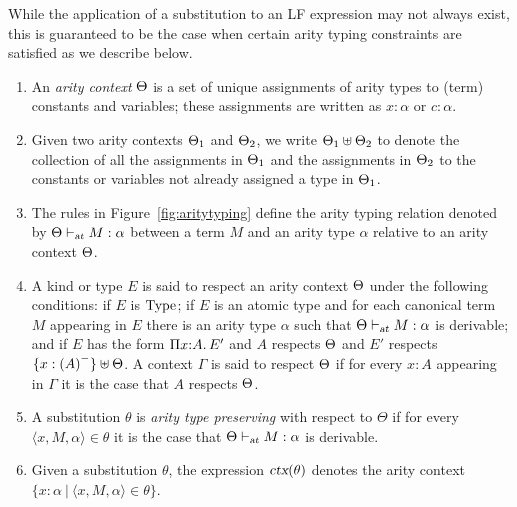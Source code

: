 While the application of a substitution to an LF expression may not
always exist, this is guaranteed to be the case when certain arity
typing constraints are satisfied as we describe below.

\begin{definition}\label{def:aritytyping}
\begin{enumerate}
\item An \emph{arity context} $\Theta$ is a set of unique
  assignments of arity types to (term) constants and variables; these
  assignments are written as $x:\alpha$ or $c:\alpha$.
%
\item Given two arity contexts $\Theta_1$ and $\Theta_2$, we write
$\Theta_1 \uplus \Theta_2$ to denote the collection of all the 
assignments in $\Theta_1$ and the assignments in $\Theta_2$ to
the constants or variables not already assigned a type in $\Theta_1$. 
%
\item
The rules in Figure~\ref{fig:aritytyping} define the arity typing
relation denoted by $\Theta \vdash_{\mbox{\sl \scriptsize at}} M : \alpha$ between
a term $M$ and an arity type $\alpha$ relative to an arity context
$\Theta$. 
%
\item 
A kind or type $E$ is said to respect an arity context $\Theta$
under the following conditions: if $E$ is $\mbox{Type}$; if $E$ is an atomic
type and for each canonical term $M$ appearing in $E$ there is an
arity type $\alpha$ such that $\Theta \vdash_{\mbox{\sl \scriptsize at}} M : \alpha$ is 
derivable; and if $E$ has the form $\Pi {x}{:}{A}.{\mkern 3mu} E'$ and $A$
respects $\Theta$ and $E'$ respects
$\{x:{(A)}^{-}\} \uplus \Theta$. 
%
A context $\Gamma$ is said to respect $\Theta$ if
for every $x:A$ appearing in $\Gamma$ it is the case that $A$ respects
$\Theta$.
%
\item
A substitution $\theta$ is {\it arity type preserving}
with respect to $\Theta$ if for every $\langle x,M,\alpha \rangle \in
\theta$ it is  the case that $\Theta \vdash_{\mbox{\sl \scriptsize at}} M : \alpha$ is
derivable. 
%
\item
Given a substitution $\theta$, the expression $\mbox{\sl ctx}(\theta)$
denotes the arity context $\{ x : \alpha\ \vert\ \langle x, M, \alpha
\rangle \in \theta \}$. 
%
\end{enumerate}
\end{definition}

